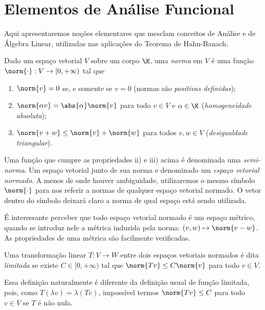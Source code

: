 
\section{Elementos de Análise Funcional}

Aqui apresentaremos noções elementares que mesclam conceitos de Análise e de Álgebra Linear, utilizadas nas aplicações do Teorema de Hahn-Banach.

\begin{defn}
    Dado um espaço vetorial \( V \) sobre um corpo \( \K \), uma \emph{norma} em \( V \) é uma função \( \norm{ \cdot } : V \to [0, +\infty) \) tal que
    \begin{enumerate}[label=\roman*)]
        \item \( \norm{ v } = 0 \) se, e somente se \( v = 0 \) (normas são \emph{positivas definidas});
        \item \( \norm{ \alpha v } = \abs{ \alpha } \norm{ v } \) para todo \( v \in V \) e \( \alpha \in \K \) (\emph{homogeneidade absoluta});
        \item \( \norm{ v + w } \leq \norm{ v } + \norm{ w } \) para todos \( v, w \in V \) (\emph{desigualdade triangular}).
    \end{enumerate}
\end{defn}
Uma função que cumpre as propriedades ii) e iii) acima é denominada uma \emph{semi-norma}.
Um espaço vetorial junto de sua norma e denominado um \emph{espaço vetorial normado}.
A menos de onde houver ambiguidade, utilizaremos o mesmo símbolo \( \norm{ \cdot } \) para nos referir a normas de qualquer espaço vetorial normado.
O vetor dentro do símbolo deixará claro a norma de qual espaço está sendo utilizada.

É interessante perceber que todo espaço vetorial normado é um espaço métrico, quando se introduz nele a métrica induzida pela norma: \( (v, w) \mapsto \norm{ v - w } \).
As propriedades de uma métrica são facilmente verificadas.

\begin{defn}
    Uma transformação linear \( T : V \to W \) entre dois espaços vetoriais normados é dita \emph{limitada} se existe \( C \in [0, +\infty) \) tal que \( \norm{ Tv } \leq C \norm{ v } \) para todo \( v \in V \).
\end{defn}
Essa definição naturalmente é diferente da definição usual de função limitada, pois, como \( T(\lambda v) = \lambda (Tv) \), impossível termos \( \norm{ Tv } \leq C \) para todo \( v \in V \) se \( T \) é não nula.

